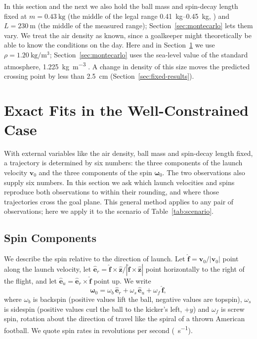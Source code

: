 \documentclass[10pt,a4paper]{article}
\begin{document}
In this section and the next we also hold the ball mass and spin-decay
length fixed at $m = \SI{0.43}{\kilo\gram}$ (the middle of the legal range
\SIrange{0.41}{0.45}{\kilo\gram}, \citealp{ifab2025}) and
$L = \SI{230}{\metre}$ (the middle of the measured range);
Section~\ref{sec:montecarlo} lets them vary. We treat the air density as
known, since a goalkeeper might theoretically be able to know the conditions on the day. Here and in
Section~\ref{sec:exact-fits} we use $\rho = \SI{1.20}{\kilo\gram\per\metre\cubed}$;
Section~\ref{sec:montecarlo} uses the sea-level value of the standard
atmosphere, \SI{1.225}{\kilo\gram\per\metre\cubed} \citep{ussa1976}. A change in
density of this size moves the predicted crossing point by less than
\SI{2.5}{\centi\metre} (Section~\ref{sec:fixed-results}).

\section{Exact Fits in the Well-Constrained Case}
\label{sec:exact-fits}

With external variables like the air density, ball mass and spin-decay length fixed, a trajectory is
determined by six numbers: the three components of the launch velocity
$\bm{v}_0$ and the three components of the spin $\bm{\omega}_0$. The two
observations also supply six numbers. In this section we ask which launch
velocities and spins reproduce both observations to within their rounding,
and where those trajectories cross the goal plane. This general method applies to any
pair of observations; here we apply it to the scenario of
Table~\ref{tab:scenario}.

\subsection{Spin Components}
\label{sec:spin-frame}

We describe the spin relative to the direction of launch. Let
$\hat{\bm{f}} = \bm{v}_0/|\bm{v}_0|$ point along the launch velocity, let
$\hat{\bm{e}}_r = \hat{\bm{f}}\times\hat{\bm{z}}/|\hat{\bm{f}}\times\hat{\bm{z}}|$
point horizontally to the right of the flight, and let
$\hat{\bm{e}}_u = \hat{\bm{e}}_r\times\hat{\bm{f}}$ point up. We write
\begin{equation}
  \bm{\omega}_0 = \omega_b\,\hat{\bm{e}}_r + \omega_s\,\hat{\bm{e}}_u
                + \omega_f\,\hat{\bm{f}},
  \label{eq:spinframe}
\end{equation}
where $\omega_b$ is backspin (positive values lift the ball, negative values
are topspin), $\omega_s$ is sidespin (positive values curl the ball to the
kicker's left, $+y$) and $\omega_f$ is screw spin, rotation about the
direction of travel like the spiral of a thrown American football. We quote spin rates in revolutions per second
(\si{\rev\per\second}).
\end{document}
